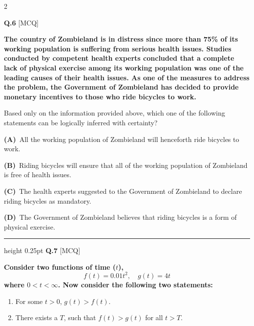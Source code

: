 \documentclass[a4paper,10pt,twoside]{article}
\begin{document}
\begin{multicols}{2}
\vspace{6pt}
\vspace{3pt}

\noindent\textbf{Q.6} \hfill {\footnotesize\textsf{[MCQ]}}
\par\vspace{2pt}
{\bfseries The country of Zombieland is in distress since more than 75\% of its working population is suffering from serious health issues. Studies conducted by competent health experts concluded that a complete lack of physical exercise among its working population was one of the leading causes of their health issues. As one of the measures to address the problem, the Government of Zombieland has decided to provide monetary incentives to those who ride bicycles to work.
\par\smallskip
Based only on the information provided above, which one of the following statements can be logically inferred with certainty? \par}
\par\vspace{2pt}\noindent
\textbf{(A)}~All the working population of Zombieland will henceforth ride bicycles to work.\par\vspace{2pt}\noindent
\textbf{(B)}~Riding bicycles will ensure that all of the working population of Zombieland is free of health issues.\par\vspace{2pt}\noindent
\textbf{(C)}~The health experts suggested to the Government of Zombieland to declare riding bicycles as mandatory.\par\vspace{2pt}\noindent
\textbf{(D)}~The Government of Zombieland believes that riding bicycles is a form of physical exercise.
\par\vspace{6pt}\hrule height 0.25pt\vspace{6pt}
\noindent\textbf{Q.7} \hfill {\footnotesize\textsf{[MCQ]}}
\par\vspace{2pt}
{\bfseries Consider two functions of time ($t$),
\[ f(t) = 0.01 t^2, \quad g(t) = 4 t \]
where $0 < t < \infty$.
Now consider the following two statements:
\begin{enumerate}[label=(\roman*),itemsep=0pt,topsep=2pt]
\item For some $t > 0$, $g(t) > f(t)$.
\item There exists a $T$, such that $f(t) > g(t)$ for all $t > T$.

\end{enumerate}}
\end{multicols}
\end{document}
